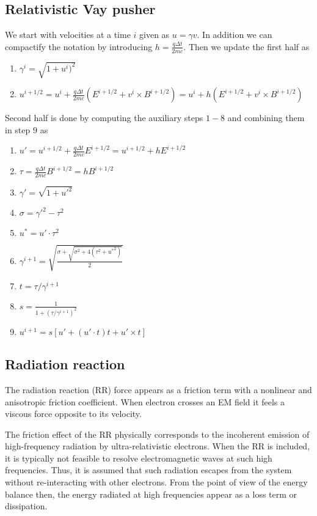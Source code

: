 \documentclass{aa}
\begin{document}
\subsection{Relativistic Vay pusher}


We start with velocities at a time $i$ given as $u = \gamma v$. 
In addition we can compactify the notation by introducing $h = \frac{q \Delta t}{2 m c}$.
Then we update the first half as
\begin{enumerate}
    \item $\gamma^i = \sqrt{1 + {u^i)^2}}$
    \item $u^{i+1/2} = u^i + \frac{q \Delta t}{2 m c} (E^{i+1/2} + v^i \times B^{i+1/2}) = u^i + h (E^{i+1/2} + v^i \times B^{i + 1/2})$
\end{enumerate}
Second half is done by computing the auxiliary steps $1-8$ and combining them in step $9$ as
\begin{enumerate}
    \item $u' = u^{i+1/2} + \frac{q \Delta t}{2 m c} E^{i+1/2} = u^{i+1/2} + h E^{i+1/2}$
    \item $\tau = \frac{q \Delta t}{2 m c} B^{i+1/2} = h B^{i + 1/2}$
    \item $\gamma' = \sqrt{1 + {u'}^2}$
    \item $\sigma = {\gamma'}^2 - \tau^2$
    \item $u^{*} = u' \cdot \tau^2$
    \item $\gamma^{i+1} = \sqrt{ \frac{\sigma + \sqrt{\sigma^2 + 4(\tau^2 + {u^{*}}^2)}}{2}}$
    \item $t = \tau / \gamma^{i+1}$
    \item $s = \frac{1}{1+(\tau/\gamma^{i+1})^2}$
    \item $u^{i+1} = s[u' + (u' \cdot t) t + u' \times t]$
\end{enumerate}

\subsection{Radiation reaction}

The radiation reaction (RR) force appears as a friction term with a nonlinear and anisotropic friction coefficient. 
When electron crosses an EM field it feels a viscous force opposite to its velocity.

The friction effect of the RR physically corresponds to the incoherent emission of high-frequency radiation by ultra-relativistic electrons.
When the RR is included, it is typically not feasible to resolve electromagnetic waves at such high frequencies.
Thus, it is assumed that such radiation escapes from the system without re-interacting with other electrons.
From the point of view of the energy balance then, the energy radiated at high frequencies appear as a loss term or dissipation.
\end{document}

